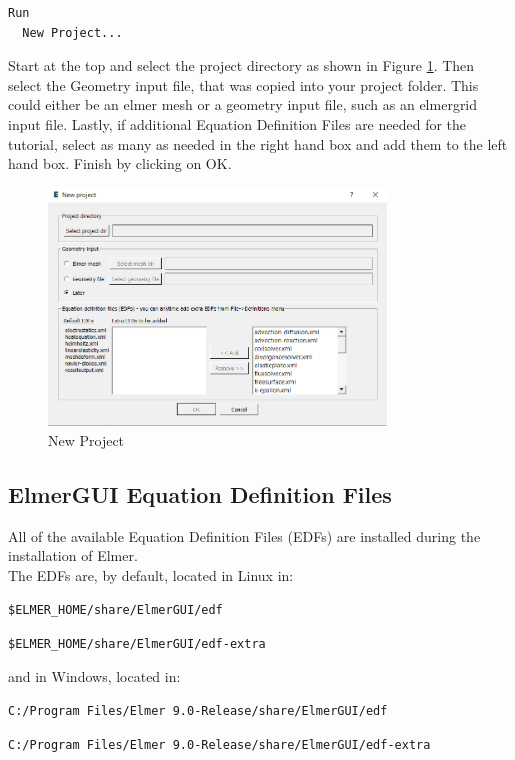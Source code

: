 \begin{verbatim}
Run
  New Project...
\end{verbatim}

Start at the top and select the project directory as shown in Figure \ref{fg:new_project}.  Then select the Geometry input file, that was copied into your project folder.  This could either be an elmer mesh or a geometry input file, such as an elmergrid input file.  Lastly, if additional Equation Definition Files are needed for the tutorial, select as many as needed in the right hand box and add them to the left hand box.  Finish by clicking on OK.

\begin{figure}[H]
\centering
\includegraphics[width=0.8\textwidth]{new_project.png}
\caption{New Project}\label{fg:new_project}
\end{figure}  

\subsection*{ElmerGUI Equation Definition Files}

All of the available Equation Definition Files (EDFs) are installed during the installation of Elmer.\\

\noindent The EDFs are, by default, located in Linux in:

\texttt{\$ELMER\_HOME/share/ElmerGUI/edf}

\texttt{\$ELMER\_HOME/share/ElmerGUI/edf-extra}

\noindent and in Windows, located in:

\texttt{C:/Program Files/Elmer 9.0-Release/share/ElmerGUI/edf}

\texttt{C:/Program Files/Elmer 9.0-Release/share/ElmerGUI/edf-extra}\\

